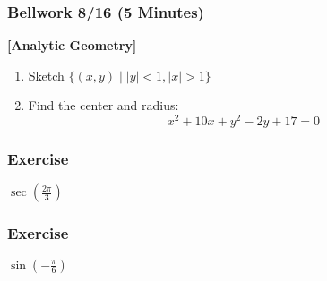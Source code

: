 \documentclass[12pt]{beamer}
\begin{document}
\begin{frame}
	\frametitle{Bellwork 8/16 (5 Minutes)}
	\initclock
	\textbf{[Analytic Geometry]}\vspace{.2cm}\\
	\vspace*{\fill}
	\vspace*{\fill}
	\vspace*{\fill}
	\begin{enumerate}
		\item Sketch $\{(x, y) \mid |y| < 1, |x| > 1\}$
		\vspace*{\fill}
		\item Find the center and radius: \[x^2 + 10x + y^2 - 2y + 17 = 0\] %
	\end{enumerate}
	\vspace*{\fill}
	\vspace*{\fill}
	\vspace*{\fill}
	\vspace*{\fill}
	\crono
\end{frame}
\begin{frame}
	\frametitle{Exercise}
	\vspace*{\fill}
	\vspace*{\fill}
	\vspace*{\fill}
	\vspace*{\fill}
	\initclock
	\LARGE
	\begin{center}
		$\sec{\left(\frac{2\pi}{3}\right)}$ %
	\end{center}
	\vspace*{\fill}
	\vspace*{\fill}
	\vspace*{\fill}
	\vspace*{\fill}
	\crono
\end{frame}
\begin{frame}
	\frametitle{Exercise}
	\vspace*{\fill}
	\vspace*{\fill}
	\vspace*{\fill}
	\vspace*{\fill}
	\initclock
	\LARGE
	\begin{center}
		$\sin{\left(-\frac{\pi}{6}\right)}$ %
	\end{center}
	\vspace*{\fill}
	\vspace*{\fill}
	\vspace*{\fill}
	\vspace*{\fill}
	\crono
\end{frame}
\end{document}
